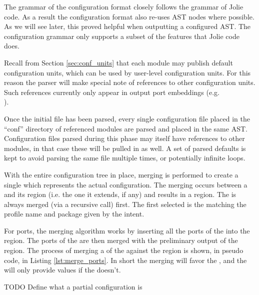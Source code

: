 The grammar of the configuration format closely follows the grammar of Jolie
code. As a result the configuration format also re-uses AST nodes where
possible. As we will see later, this proved helpful when outputting a
configured AST. The configuration grammar only supports a subset of the
features that Jolie code does.

Recall from Section \ref{sec:conf_units} that each module may publish default
configuration units, which can be used by user-level configuration units. For
this reason the parser will make special note of references to other
configuration units. Such references currently only appear in output port
embeddings (e.g. \\).

Once the initial file has been parsed, every single configuration file placed
in the ``conf'' directory of referenced modules are parsed and placed in the
same AST. Configuration files parsed during this phase may itself have
references to other modules, in that case these will be pulled in as well.  A
set of parsed defaults is kept to avoid parsing the same file multiple times,
or potentially infinite loops.


With the entire configuration tree in place, merging is performed to create a
single  which represents the actual configuration. The merging
occurs between a  and its  region (i.e. the one it
extends, if any) and results in a  region. The  is
always merged (via a recursive call) first. The first  selected is
the  matching the profile name and package given by the intent.

For ports, the merging algorithm works by inserting all the ports of the
 into the  region. The ports of the  are
then merged with the preliminary output of the  region. The
process of merging a  of the  against the 
region is shown, in pseudo code, in Listing \ref{lst:merge_ports}. In short the
merging will favor the , and the  will only provide
values if the  doesn't.

TODO Define what a partial configuration is

